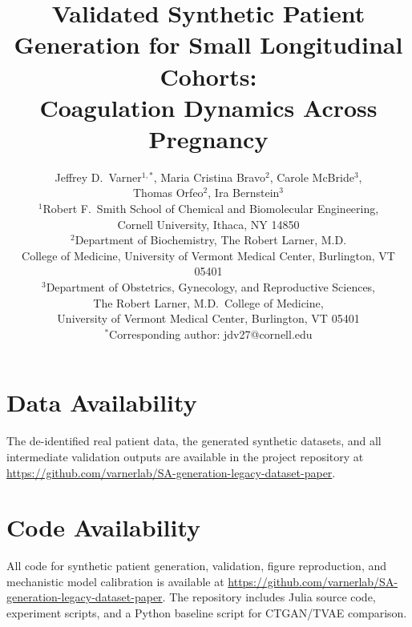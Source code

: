 \documentclass[11pt]{article}
\title{Validated Synthetic Patient Generation for Small Longitudinal Cohorts: \\
Coagulation Dynamics Across Pregnancy}
\author{
Jeffrey D.\ Varner$^{1,*}$,
Maria Cristina Bravo$^{2}$,
Carole McBride$^{3}$,
\\
Thomas Orfeo$^{2}$,
Ira Bernstein$^{3}$
\\[6pt]
{\small $^{1}$Robert F.\ Smith School of Chemical and Biomolecular Engineering,} \\
{\small Cornell University, Ithaca, NY 14850} \\
{\small $^{2}$Department of Biochemistry, The Robert Larner, M.D.} \\
{\small College of Medicine, University of Vermont Medical Center, Burlington, VT 05401} \\
{\small $^{3}$Department of Obstetrics, Gynecology, and Reproductive Sciences,} \\
{\small The Robert Larner, M.D.\ College of Medicine,} \\
{\small University of Vermont Medical Center, Burlington, VT 05401} \\[6pt]
{\small $^{*}$Corresponding author: jdv27@cornell.edu}
}
\date{}
\newcommand{\rthree}[1]{\textcolor[rgb]{0.05,0.50,0.25}{#1}}  %
\newcommand{\rthree}[1]{#1}
\begin{document}
\maketitle

\begin{abstract}

\end{abstract}






\section*{Data Availability}
\rthree{The de-identified real patient data, the generated synthetic datasets, and all
intermediate validation outputs are available in the project repository at
\url{https://github.com/varnerlab/SA-generation-legacy-dataset-paper}.}

\section*{Code Availability}
All code for synthetic patient generation, validation, figure reproduction,
and mechanistic model calibration is available at
\url{https://github.com/varnerlab/SA-generation-legacy-dataset-paper}.
The repository includes Julia source code, experiment scripts, and a Python
baseline script for CTGAN/TVAE comparison.






\clearpage

\end{document}
